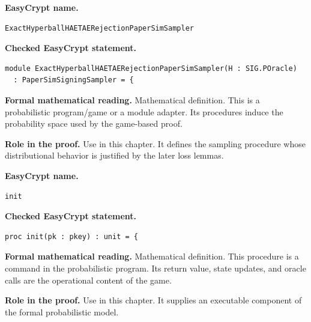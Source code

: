\begin{formaldefinition}
\noindent\textbf{EasyCrypt name.}
\begin{lstlisting}[language=EasyCrypt,basicstyle=\ttfamily\scriptsize]
ExactHyperballHAETAERejectionPaperSimSampler
\end{lstlisting}
\noindent\textbf{Checked EasyCrypt statement.}
\begin{lstlisting}[language=EasyCrypt,basicstyle=\ttfamily\scriptsize]
module ExactHyperballHAETAERejectionPaperSimSampler(H : SIG.POracle)
  : PaperSimSigningSampler = {
\end{lstlisting}
\noindent\textbf{Formal mathematical reading.}
Mathematical definition. This is a probabilistic program/game or a module adapter.  Its procedures induce the probability space used by the game-based proof.

\noindent\textbf{Role in the proof.}
Use in this chapter. It defines the sampling procedure whose distributional behavior is justified by the later loss lemmas.

\end{formaldefinition}

\begin{formaldefinition}
\noindent\textbf{EasyCrypt name.}
\begin{lstlisting}[language=EasyCrypt,basicstyle=\ttfamily\scriptsize]
init
\end{lstlisting}
\noindent\textbf{Checked EasyCrypt statement.}
\begin{lstlisting}[language=EasyCrypt,basicstyle=\ttfamily\scriptsize]
proc init(pk : pkey) : unit = {
\end{lstlisting}
\noindent\textbf{Formal mathematical reading.}
Mathematical definition. This procedure is a command in the probabilistic program.  Its return value, state updates, and oracle calls are the operational content of the game.

\noindent\textbf{Role in the proof.}
Use in this chapter. It supplies an executable component of the formal probabilistic model.

\end{formaldefinition}

